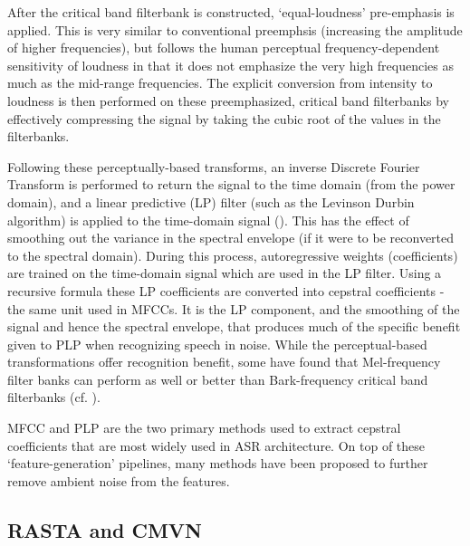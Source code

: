 After the critical band filterbank is constructed, `equal-loudness' pre-emphasis is applied.  This is very similar to conventional preemphsis (increasing the amplitude of higher frequencies), but follows the human perceptual frequency-dependent sensitivity of loudness in that it does not emphasize the very high frequencies as much as the mid-range frequencies.%
The explicit conversion from intensity to loudness is then performed on these preemphasized, critical band filterbanks by effectively compressing the signal by taking the cubic root of the values in the filterbanks.

Following these perceptually-based transforms, an inverse Discrete Fourier Transform is performed to return the signal to the time domain (from the power domain), and a linear predictive (LP) filter (such as the Levinson Durbin algorithm) is applied to the time-domain signal (\cite{gold:11}).  This has the effect of smoothing out the variance in the spectral envelope (if it were to be reconverted to the spectral domain).  During this process, autoregressive weights (coefficients) are trained on the time-domain signal which are used in the LP filter.  Using a recursive formula these LP coefficients are converted into cepstral coefficients - the same unit used in MFCCs.  It is the LP component, and the smoothing of the signal and hence the spectral envelope, that produces much of the specific benefit given to PLP when recognizing speech in noise.  While the perceptual-based transformations offer recognition benefit, some have found that Mel-frequency filter banks can perform as well or better than Bark-frequency critical band filterbanks (cf. \cite{honig:05}).

MFCC and PLP are the two primary methods used to extract cepstral coefficients that are most widely used in ASR architecture.  On top of these `feature-generation' pipelines, many methods have been proposed to further remove ambient noise from the features.

\DIFdelbegin \subsubsection{}%
\addtocounter{subsubsection}{-1}%
\DIFdelend \DIFaddbegin \subsection{RASTA and CMVN}\DIFaddend \label{sec:rasta_cmvn}

